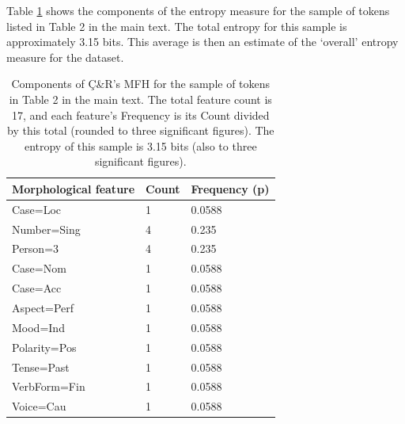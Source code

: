 \documentclass[USenglish]{article}
\begin{document}
\noindent Table \ref{tab:mfh} shows the components of the entropy measure for the sample of tokens listed in Table 2 in the main text.
The total entropy for this sample is approximately 3.15 bits.
This average is then an estimate of the `overall' entropy measure for the dataset.

\begin{table}[ht]
    \centering
    \caption{Components of Ç\&R's MFH for the sample of tokens in Table 2 in the main text.
    The total feature count is 17, and each feature's Frequency is its Count divided by this total (rounded to three significant figures). The entropy of this sample is 3.15 bits (also to three significant figures).} %
    \label{tab:mfh}   
    \begin{tabular}{p{5cm}p{3cm}p{3cm}}
\toprule
	\textbf{Morphological feature}	&	\textbf{Count}	&	\textbf{Frequency (p)}	\\
    \midrule
	Case=Loc&1&0.0588       \\    \midrule
	Number=Sing&4&0.235    \\    \midrule
        Person=3&4&0.235		   \\    \midrule
	Case=Nom&1&0.0588	       \\    \midrule
	Case=Acc&1&0.0588		      \\    \midrule
        Aspect=Perf&1&0.0588      \\    \midrule
        Mood=Ind&1&0.0588		   \\    \midrule
        Polarity=Pos&1&0.0588		\\    \midrule
	Tense=Past&1&0.0588	     \\    \midrule
	VerbForm=Fin&1&0.0588	    \\    \midrule
	Voice=Cau&1&0.0588      	\\ \bottomrule

    \end{tabular}
\end{table}
\end{document}
